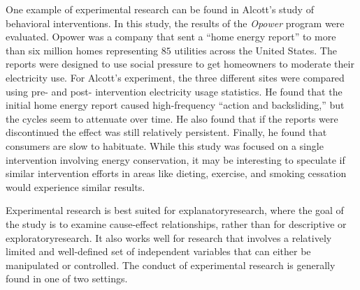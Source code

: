One example of experimental research can be found in Alcott's study of behavioral interventions\cite{allcott2014short}. In this study, the results of the \textit{Opower} program were evaluated. Opower was a company that sent a ``home energy report'' to more than six million homes representing $ 85 $ utilities across the United States. The reports were designed to use social pressure to get homeowners to moderate their electricity use. For Alcott's experiment, the three different sites were compared using pre- and post- intervention electricity usage statistics. He found that the initial home energy report caused high-frequency ``action and backsliding,'' but the cycles seem to attenuate over time. He also found that if the reports were discontinued the effect was still relatively persistent. Finally, he found that consumers are slow to habituate. While this study was focused on a single intervention involving energy conservation, it may be interesting to speculate if similar intervention efforts in areas like dieting, exercise, and smoking cessation would experience similar results.

Experimental research is best suited for \gls{explanatoryresearch}, where the goal of the study is to examine cause-effect relationships, rather than for descriptive or \gls{exploratoryresearch}. It also works well for research that involves a relatively limited and well-defined set of independent variables that can either be manipulated or controlled. The conduct of experimental research is generally found in one of two settings. 

